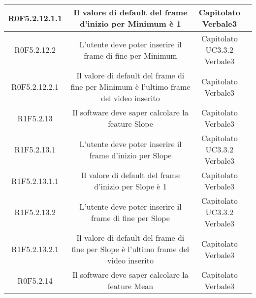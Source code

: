 \begin{center}
\begin{longtable}{|c|c|c|c|}
\hline
R0F5.2.12.1.1   & \parbox[t]{\larghezza}{Il valore di default del frame d'inizio per Minimum è 1}  & \parbox[t]{\dimFonti}{ Capitolato \\ Verbale3 \\} \\
\hline
R0F5.2.12.2   & \parbox[t]{\larghezza}{L'utente deve poter inserire il frame di fine per Minimum}  & \parbox[t]{\dimFonti}{ Capitolato \\ UC3.3.2 \\ Verbale3 \\} \\
\hline
R0F5.2.12.2.1   & \parbox[t]{\larghezza}{Il valore di default del frame di fine per Minimum è l'ultimo frame del video inserito}  & \parbox[t]{\dimFonti}{ Capitolato \\ Verbale3 \\} \\
\hline
R1F5.2.13   & \parbox[t]{\larghezza}{Il software deve saper calcolare la feature\glossario{} Slope}  & \parbox[t]{\dimFonti}{ Capitolato \\ Verbale3 \\} \\
\hline
R1F5.2.13.1   & \parbox[t]{\larghezza}{L'utente deve poter inserire il frame d'inizio per Slope}  & \parbox[t]{\dimFonti}{ Capitolato \\ UC3.3.2 \\ Verbale3 \\} \\
\hline
R1F5.2.13.1.1   & \parbox[t]{\larghezza}{Il valore di default del frame d'inizio per Slope è 1}  & \parbox[t]{\dimFonti}{ Capitolato \\ Verbale3 \\} \\
\hline
R1F5.2.13.2   & \parbox[t]{\larghezza}{L'utente deve poter inserire il frame di fine per Slope}  & \parbox[t]{\dimFonti}{ Capitolato \\ UC3.3.2 \\ Verbale3 \\} \\
\hline
R1F5.2.13.2.1   & \parbox[t]{\larghezza}{Il valore di default del frame di fine per Slope è l'ultimo frame del video inserito}  & \parbox[t]{\dimFonti}{ Capitolato \\ Verbale3 \\} \\
\hline
R0F5.2.14   & \parbox[t]{\larghezza}{Il software deve saper calcolare la feature\glossario{} Mean}  & \parbox[t]{\dimFonti}{ Capitolato \\ Verbale3 \\} \\

\end{longtable}
\end{center}
